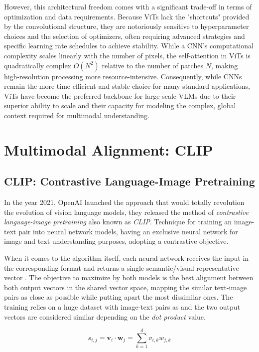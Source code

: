 However, this architectural freedom comes with a significant trade-off in terms of optimization and data requirements. Because ViTs lack the "shortcuts" provided by the convolutional structure, they are notoriously sensitive to hyperparameter choices and the selection of optimizers, often requiring advanced strategies and specific learning rate schedules to achieve stability. While a CNN's computational complexity scales linearly with the number of pixels, the self-attention in ViTs is quadratically complex $O(N^2)$ relative to the number of patches $N$, making high-resolution processing more resource-intensive. Consequently, while CNNs remain the more time-efficient and stable choice for many standard applications, ViTs have become the preferred backbone for large-scale VLMs due to their superior ability to scale and their capacity for modeling the complex, global context required for multimodal understanding.


\section{Multimodal Alignment: CLIP}
\subsection{CLIP: Contrastive Language-Image Pretraining}
In the year 2021, OpenAI launched the approach that would totally revolution the evolution of vision language models, they released the method of \textit{contrastive language-image pretraining} also known as \textit{CLIP}. Technique for training an image-text pair into neural network models, having an exclusive neural network for image and text understanding purposes, adopting a contrastive objective. 

When it comes to the algorithm itself, each neural network receives the input in the corresponding format and returns a single semantic/visual representative vector \cite{wiki:clip}. The objective to maximize by both models is the best alignment between both output vectors in the shared vector space, mapping the similar text-image pairs as close as possible while putting apart the most dissimilar ones. The training relies on a huge dataset with image-text pairs as and the two output vectors are considered similar depending on the \textit{dot product} value. 

\begin{equation}
	s_{i,j} = \mathbf{v}_i \cdot \mathbf{w}_j = \sum_{k=1}^{d} v_{i,k} w_{j,k}
\end{equation}


